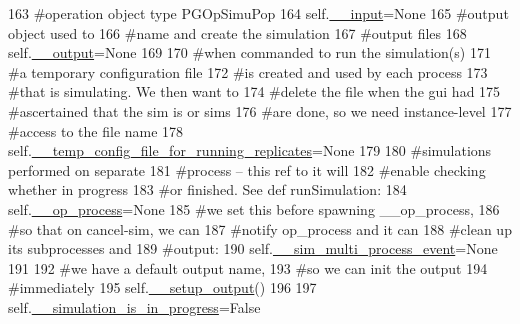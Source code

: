 \begin{DoxyCode}
163         \textcolor{comment}{#operation object type PGOpSimuPop}
164         self.\hyperlink{classnegui_1_1pgguisimupop_1_1PGGuiSimuPop_a0b9f7d933b428393d34105828600a007}{\_\_input}=\textcolor{keywordtype}{None}
165         \textcolor{comment}{#output object used to}
166         \textcolor{comment}{#name and create the simulation}
167         \textcolor{comment}{#output files}
168         self.\hyperlink{classnegui_1_1pgguisimupop_1_1PGGuiSimuPop_a30f6eabf78230001520f90cb36de339f}{\_\_output}=\textcolor{keywordtype}{None}
169 
170         \textcolor{comment}{#when commanded to run the simulation(s)}
171         \textcolor{comment}{#a temporary configuration file}
172         \textcolor{comment}{#is created and used by each process}
173         \textcolor{comment}{#that is simulating.  We then want to}
174         \textcolor{comment}{#delete the file when the gui had }
175         \textcolor{comment}{#ascertained that the sim is or sims}
176         \textcolor{comment}{#are done, so we need instance-level}
177         \textcolor{comment}{#access to the file name}
178         self.\hyperlink{classnegui_1_1pgguisimupop_1_1PGGuiSimuPop_a60c4be477f462c6981a08c479c20a893}{\_\_temp\_config\_file\_for\_running\_replicates}=\textcolor{keywordtype}{None}
179 
180         \textcolor{comment}{#simulations performed on separate}
181         \textcolor{comment}{#process -- this ref to it will}
182         \textcolor{comment}{#enable checking whether in progress}
183         \textcolor{comment}{#or finished.  See def runSimulation:}
184         self.\hyperlink{classnegui_1_1pgguisimupop_1_1PGGuiSimuPop_acdcfde3516741c64806c6881f65c6f4e}{\_\_op\_process}=\textcolor{keywordtype}{None}
185         \textcolor{comment}{#we set this before spawning \_\_op\_process,}
186         \textcolor{comment}{#so that on cancel-sim, we can}
187         \textcolor{comment}{#notify op\_process and it can }
188         \textcolor{comment}{#clean up its subprocesses and }
189         \textcolor{comment}{#output:}
190         self.\hyperlink{classnegui_1_1pgguisimupop_1_1PGGuiSimuPop_a02ccc7da9aec67e8e13e083001aba15b}{\_\_sim\_multi\_process\_event}=\textcolor{keywordtype}{None}
191 
192         \textcolor{comment}{#we have a default output name,}
193         \textcolor{comment}{#so we can init the output}
194         \textcolor{comment}{#immediately}
195         self.\hyperlink{classnegui_1_1pgguisimupop_1_1PGGuiSimuPop_a23913431472d154054d66ab5e72daf0e}{\_\_setup\_output}()
196 
197         self.\hyperlink{classnegui_1_1pgguisimupop_1_1PGGuiSimuPop_a5064bac64c69bd13fe1366b21f1f7ad9}{\_\_simulation\_is\_in\_progress}=\textcolor{keyword}{False}

\end{DoxyCode}
